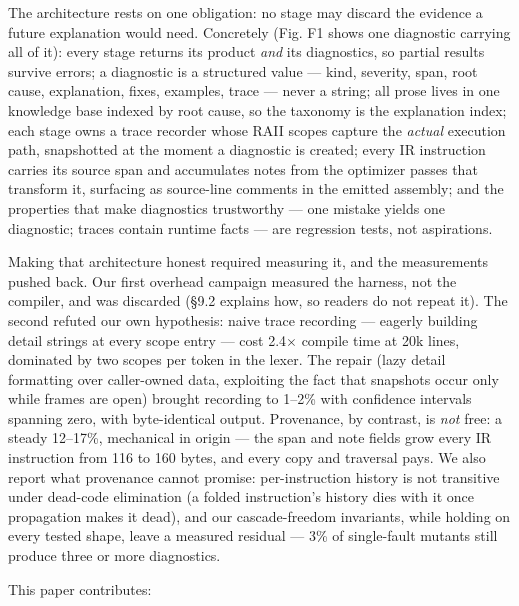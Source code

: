 The architecture rests on one obligation: no stage may discard the
evidence a future explanation would need. Concretely (Fig. F1 shows
one diagnostic carrying all of it): every stage returns its product
\emph{and} its diagnostics, so partial results survive errors; a
diagnostic is a structured value --- kind, severity, span, root cause,
explanation, fixes, examples, trace --- never a string; all prose
lives in one knowledge base indexed by root cause, so the taxonomy
is the explanation index; each stage owns a trace recorder whose
RAII scopes capture the \emph{actual} execution path, snapshotted at the
moment a diagnostic is created; every IR instruction carries its
source span and accumulates notes from the optimizer passes that
transform it, surfacing as source-line comments in the emitted
assembly; and the properties that make diagnostics trustworthy ---
one mistake yields one diagnostic; traces contain runtime facts ---
are regression tests, not aspirations.

Making that architecture honest required measuring it, and the
measurements pushed back. Our first overhead campaign measured the
harness, not the compiler, and was discarded (\S9.2 explains how, so
readers do not repeat it). The second refuted our own hypothesis:
naive trace recording --- eagerly building detail strings at every
scope entry --- cost 2.4$\times$ compile time at 20k lines, dominated by two
scopes per token in the lexer. The repair (lazy detail formatting
over caller-owned data, exploiting the fact that snapshots occur
only while frames are open) brought recording to 1--2\% with
confidence intervals spanning zero, with byte-identical output.
Provenance, by contrast, is \emph{not} free: a steady 12--17\%, mechanical
in origin --- the span and note fields grow every IR instruction from
116 to 160 bytes, and every copy and traversal pays. We also report
what provenance cannot promise: per-instruction history is not
transitive under dead-code elimination (a folded instruction's
history dies with it once propagation makes it dead), and our
cascade-freedom invariants, while holding on every tested shape,
leave a measured residual --- 3\% of single-fault mutants still
produce three or more diagnostics.

This paper contributes:

